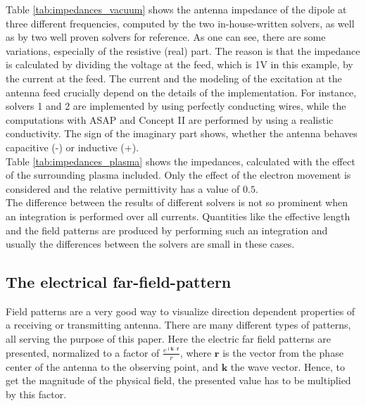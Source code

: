 \documentclass[two-coloumn,ras]{agutex}
\begin{document}
\begin{article}
Table \ref{tab:impedances_vacuum} shows the antenna impedance of the dipole at three different frequencies, computed by the two in-house-written solvers, as well as by two well proven solvers for reference. As one can see, there are some variations, especially of the resistive (real) part. The reason is that the impedance is calculated by dividing the voltage at the feed, which is 1V in this example, by the current at the feed. The current and the modeling of the excitation at the antenna feed crucially depend on the details of the implementation. For instance, solvers 1 and 2 are implemented by using perfectly conducting wires, while the computations with ASAP and Concept II are performed by using a realistic conductivity. The sign of the imaginary part shows, whether the antenna behaves capacitive (-) or inductive (+).\\

Table \ref{tab:impedances_plasma} shows the impedances, calculated with the effect of the surrounding plasma included. Only the effect of the electron movement is considered and the relative permittivity has a value of $0.5$.\\

The difference between the results of different solvers is not so prominent when an integration is performed over all currents. Quantities like the effective length and the field patterns are produced by performing such an integration and usually the differences between the solvers are small in these cases.\\


\subsection{The electrical far-field-pattern}
Field patterns are a very good way to visualize direction dependent properties of a receiving or transmitting antenna. There are many different types of patterns, all serving the purpose of this paper. Here the electric far field patterns are presented, normalized to a factor of $\frac{e^{\imath \mathbf{k}\cdot \mathbf{r}}}{r}$, where $\mathbf{r}$ is the vector from the phase center of the antenna to the observing point, and $\mathbf{k}$ the wave vector. Hence, to get the magnitude of the physical field, the presented value has to be multiplied by this factor.\\


\end{article}
\end{document}
